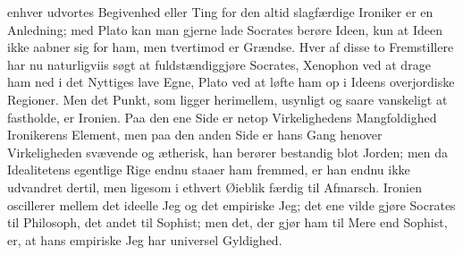 \documentclass[12pt,a4paper]{article}
\begin{document}
enhver udvortes Begivenhed eller Ting for den altid slagfærdige Ironiker er en Anledning; med Plato kan man gjerne lade Socrates berøre Ideen, kun at Ideen ikke aabner sig for ham, men tvertimod er Grændse. Hver af disse to Fremstillere har nu naturligviis søgt at fuldstændiggjøre Socrates, Xenophon ved at drage ham ned i det Nyttiges lave Egne, Plato ved at løfte ham op i Ideens overjordiske Regioner. Men det Punkt, som ligger herimellem, usynligt og saare vanskeligt at fastholde, er Ironien. Paa den ene Side er netop Virkelighedens Mangfoldighed Ironikerens Element, men paa den anden Side er hans Gang henover Virkeligheden svævende og ætherisk, han berører bestandig blot Jorden; men da Idealitetens egentlige Rige endnu staaer ham fremmed, er han endnu ikke udvandret dertil, men ligesom i ethvert Øieblik færdig til Afmarsch. Ironien oscillerer mellem det ideelle Jeg og det empiriske Jeg; det ene vilde gjøre Socrates til Philosoph, det andet til Sophist; men det, der gjør ham til Mere end Sophist, er, at hans empiriske Jeg har universel Gyldighed.
\end{document}
